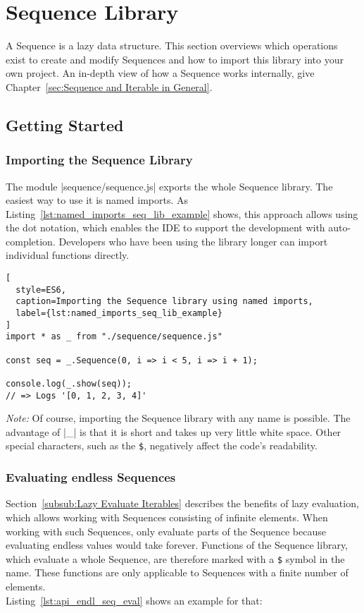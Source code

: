 \section{Sequence Library} %
\label{sec:Sequence Library}
A Sequence is a lazy data structure. This section overviews which operations
exist to create and modify Sequences and how to import this library into your
own project. An in-depth view of how a Sequence works
internally, give Chapter~\ref{sec:Sequence and Iterable in General}.

\subsection{Getting Started} %
\label{sub:Getting Started}
\subsubsection{Importing the Sequence Library} %
\label{subsub:Importing the Sequence Library}

The module |sequence/sequence.js| exports the whole Sequence library. The
easiest way to use it is named imports. As
Listing~\ref{lst:named_imports_seq_lib_example} shows, this approach allows
using the dot notation, which enables the IDE to support the development with
auto-completion. Developers who have been using the library longer can import
individual functions directly.
\begin{lstlisting}[
  style=ES6,
  caption=Importing the Sequence library using named imports,
  label={lst:named_imports_seq_lib_example}
]
import * as _ from "./sequence/sequence.js"

const seq = _.Sequence(0, i => i < 5, i => i + 1);

console.log(_.show(seq));
// => Logs '[0, 1, 2, 3, 4]'
\end{lstlisting}
\textit{Note:} Of course, importing the Sequence library with any name is
possible. The advantage of |_| is that it is short and takes up very little
white space. Other special characters, such as the \lstinline{$}, negatively
affect the code's readability. 

\subsubsection{Evaluating endless Sequences} %
\label{subsub:Evaluating endless Sequences}
Section~\ref{subsub:Lazy Evaluate Iterables} describes the benefits of lazy
evaluation, which allows working with Sequences consisting of infinite
elements. When working with such Sequences, only evaluate parts of the Sequence
because evaluating endless values would take forever. Functions of the Sequence
library, which evaluate a whole Sequence, are therefore marked with a
\lstinline{$} symbol in the name. These functions are only applicable to
Sequences with a finite number of elements. \\
Listing~\ref{lst:api_endl_seq_eval} shows an example for that:

